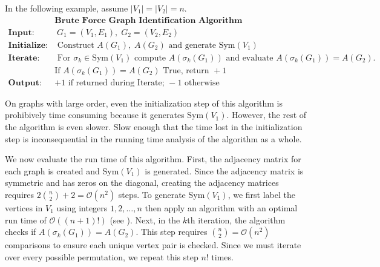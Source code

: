 	\begin{example}
		In the following example, assume $|V_1|=|V_2|=n$.
		\begin{align*}
			&\textbf{Brute Force Graph Identification Algorithm}\\
		\textbf{Input:}&\;G_1=(V_1,E_1),\;G_2=(V_2,E_2)\\
		\textbf{Initialize:}&\text{ Construct }A(G_1),\;A(G_2)\text{ and generate Sym}(V_1)\\
		\textbf{Iterate:}&\text{ For }\sigma_k\in\text{Sym}(V_1)\text{ compute }A(\sigma_k(G_1))\text{ and evaluate }A(\sigma_k(G_1))=A(G_2).\\&\text{If }A(\sigma_k(G_1))=A(G_2)\text{ True, return }+1\\
		\textbf{Output:}&+1\text{ if returned during Iterate; } -1\text{ otherwise}
		\end{align*}
		\begin{remark}
	On graphs with large order, even the initialization step of this algorithm is prohibively time consuming because it generates Sym$(V_1)$. However, the rest of the algorithm is even slower. Slow enough that the time lost in the initialization step is inconsequential in the running time analysis of the algorithm as a whole.
		\end{remark}
		We now evaluate the run time of this algorithm. First, the adjacency matrix for each graph is created and Sym$(V_1)$ is generated. Since the adjacency matrix is symmetric and has zeros on the diagonal, creating the adjacency matrices requires $2{n\choose 2}+2=\mathcal{O}(n^2)$ steps. To generate Sym$(V_1)$, we first label the vertices in $V_1$ using integers $1,2,\dots,n$ then apply an algorithm with an optimal run time of $\mathcal{O}((n+1)!)$ (see \cite{johnson1963generation,heap1963permutations}). Next, in the $k$th iteration, the algorithm checks if $A(\sigma_k(G_1))=A(G_2)$. This step requires ${n\choose 2}=\mathcal{O}(n^2)$ comparisons to ensure each unique vertex pair is checked. Since we must iterate over every possible permutation, we repeat this step $n!$ times.

\end{example}
